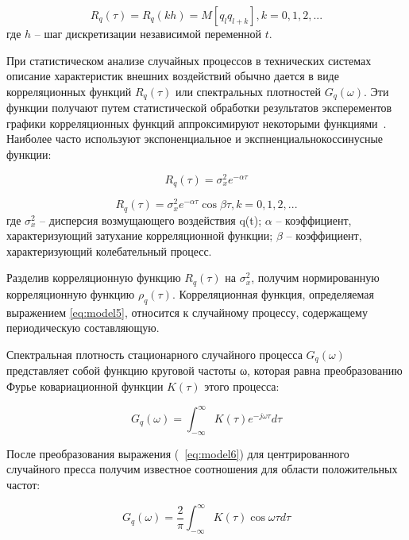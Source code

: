 \begin{equation} \label{eq:model3}
{R}_{q}(\tau) = {R}_{q}(kh) = M[q_l q_{l+k}], k=0,1,2,...
\end{equation}
где $h$ – шаг дискретизации независимой переменной $t$.

При статистическом анализе случайных процессов в технических системах
описание характеристик внешних воздействий обычно дается в виде
корреляционных функций ${R}_{q}(\tau)$ или спектральных плотностей $G_q(\omega)$. Эти
функции получают путем статистической обработки результатов эксперементов
графики корреляционных функций аппроксимируют некоторыми функциями~\cite{modeling:2004}. Наиболее часто используют экспоненциальное и экспненциальнокоссинусные функции:


\begin{equation} \label{eq:model4}
{R}_{q}(\tau) = {\sigma}_{x}^{2} e^{-\alpha \tau}
\end{equation}

\begin{equation} \label{eq:model5}
{R}_{q}(\tau) = {\sigma}_{x}^{2} e^{-\alpha \tau} \cos\beta\tau, k=0,1,2,...
\end{equation}
где ${\sigma}_{x}^{2}$ -- дисперсия возмущающего воздействия q(t);
$\alpha$ -- коэффициент, характеризующий затухание корреляционной функции;
$\beta$ -- коэффициент, характеризующий колебательный процесс.


Разделив корреляционную функцию ${R}_{q}(\tau)$ на ${\sigma}_{x}^{2}$, получим нормированную
корреляционную функцию ${\rho}_{q}(\tau)$. Корреляционная функция, определяемая
выражением \ref{eq:model5}, относится к случайному процессу, содержащему
периодическую составляющую.

Спектральная плотность стационарного случайного процесса $G_q(\omega)$
представляет собой функцию круговой частоты ω, которая равна
преобразованию Фурье ковариационной функции $K(\tau)$ этого процесса:

\begin{equation} \label{eq:model6}
G_q(\omega) = \int_{-\infty}^{\infty} K(\tau) e^{-j\omega\tau} d\tau
\end{equation}

После преобразования выражения (~\ref{eq:model6}) для центрированного случайного
пресса получим известное соотношения для области положительных частот:

\begin{equation} \label{eq:model7}
G_q(\omega) = \frac{2}{\pi}\int_{-\infty}^{\infty} K(\tau) \cos\omega\tau d\tau
\end{equation}

